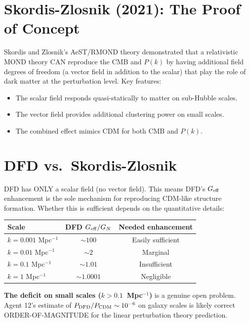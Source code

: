 \documentclass[11pt]{article}
\begin{document}
\section{Skordis-Zlosnik (2021): The Proof of Concept}

Skordis and Zlosnik's AeST/RMOND theory demonstrated that a relativistic
MOND theory CAN reproduce the CMB and $P(k)$ by having additional field
degrees of freedom (a vector field in addition to the scalar) that play
the role of dark matter at the perturbation level. Key features:
\begin{itemize}[nosep]
\item The scalar field responds quasi-statically to matter on sub-Hubble scales.
\item The vector field provides additional clustering power on small scales.
\item The combined effect mimics CDM for both CMB and $P(k)$.
\end{itemize}

\section{DFD vs.\ Skordis-Zlosnik}

DFD has ONLY a scalar field (no vector field). This means DFD's
$G_{\rm eff}$ enhancement is the sole mechanism for reproducing CDM-like
structure formation. Whether this is sufficient depends on the quantitative
details:

\begin{center}
\begin{tabular}{lcc}
\toprule
Scale & DFD $G_{\rm eff}/G_N$ & Needed enhancement \\
\midrule
$k = 0.001$ Mpc$^{-1}$ & $\sim 100$ & Easily sufficient \\
$k = 0.01$ Mpc$^{-1}$ & $\sim 2$ & Marginal \\
$k = 0.1$ Mpc$^{-1}$ & $\sim 1.01$ & Insufficient \\
$k = 1$ Mpc$^{-1}$ & $\sim 1.0001$ & Negligible \\
\bottomrule
\end{tabular}
\end{center}

\textbf{The deficit on small scales ($k > 0.1$~Mpc$^{-1}$)} is a genuine
open problem. Agent 12's estimate of $P_{\rm DFD}/P_{\rm CDM} \sim 10^{-6}$
on galaxy scales is likely correct ORDER-OF-MAGNITUDE for the linear
perturbation theory prediction.
\end{document}
